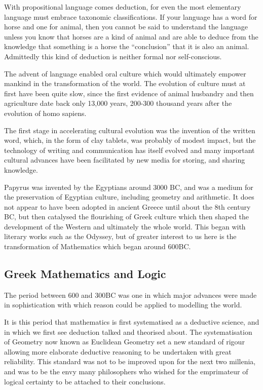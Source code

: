 \documentclass[10pt,titlepage]{book}
\begin{document}
With propositional language comes deduction, for even the most elementary language must embrace taxonomic classifications.
If your language has a word for horse and one for animal, then you cannot be said to understand the language unless you know that horses are a kind of animal and are able to deduce from the knowledge that something is a horse the ``conclusion'' that it is also an animal.
Admittedly this kind of deduction is neither formal nor self-conscious.

The advent of language enabled oral culture which would ultimately empower mankind in the transformation of the world.
The evolution of culture must at first have been quite slow, since the first evidence of animal husbandry and then agriculture date back only 13,000 years, 200-300 thousand years after the evolution of homo sapiens.

The first stage in accelerating cultural evolution was the invention of the written word, which, in the form of clay tablets, was probably of modest impact, but the technology of writing and communication has itself evolved and many important cultural advances have been facilitated by new media for storing, and sharing knowledge.

Papyrus was invented by the Egyptians around 3000 BC, and was a medium for the preservation of Egyptian culture, including geometry and arithmetic.
It does not appear to have been adopted in ancient Greece until about the 8th century BC, but then catalysed the flourishing of Greek culture which then shaped the development of the Western and ultimately the whole world.
This began with literary works such as the Odyssey, but of greater interest to us here is the transformation of Mathematics which began around 600BC.

\subsection{Greek Mathematics and Logic}

The period between 600 and 300BC was one in which major advances were made in sophistication with which reason could be applied to modelling the world.

It is this period that mathematics is first systematised as a deductive science, and in which we first see deduction talked and theorised about.
The systematisation of Geometry now known as Euclidean Geometry set a new standard of rigour allowing more elaborate deductive reasoning to be undertaken with great reliability.
This standard was not to be improved upon for the next two millenia, and was to be the envy many philosophers who wished for the emprimateur of logical certainty to be attached to their conclusions.
\end{document}
